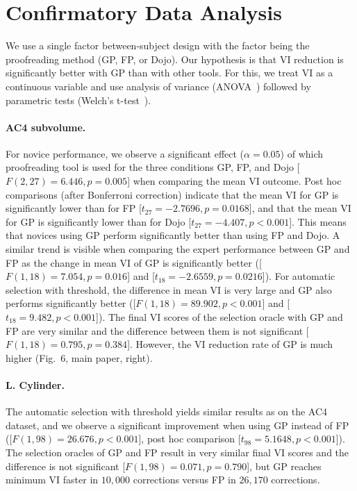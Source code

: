 \section{Confirmatory Data Analysis} 

We use a single factor between-subject design with the factor being the proofreading method (GP, FP, or Dojo). Our hypothesis is that VI reduction is significantly better with GP than with other tools. For this, we treat VI as a continuous variable and use analysis of variance (ANOVA~\cite{shaffer1995}) followed by parametric tests (Welch's t-test~\cite{welch}).

\paragraph{AC4 subvolume.} For novice performance, we observe a significant effect ($\alpha=0.05$) of which proofreading tool is used for the three conditions GP, FP, and Dojo [$F(2,27) = 6.446, p = 0.005$] when comparing the mean VI outcome. Post hoc comparisons (after Bonferroni correction) indicate that the mean VI for GP is significantly lower than for FP [$t_{27} = -2.7696, p = 0.0168$], and that the mean VI for GP is significantly lower than for Dojo [$t_{27} = -4.407, p < 0.001$]. This means that novices using GP perform significantly better than using FP and Dojo.
A similar trend is visible when comparing the expert performance between GP and FP as the change in mean VI of GP is significantly better ([$F(1,18) = 7.054, p = 0.016$] and [$t_{18} = -2.6559, p = 0.0216$]). For automatic selection with threshold, the difference in mean VI is very large and GP also performs significantly better ([$F(1,18) = 89.902, p < 0.001$] and [$t_{18} = 9.482, p < 0.001$]). The final VI scores of the selection oracle with GP and FP are very similar and the difference between them is not significant [$F(1,18) = 0.795, p = 0.384$]. However, the VI reduction rate of GP is much higher (Fig.~6, main paper, right).

\paragraph{L. Cylinder.} The automatic selection with threshold yields similar results as on the AC4 dataset, and we observe a significant improvement when using GP instead of FP ([$F(1,98) = 26.676, p < 0.001$], post hoc comparison [$t_{98} = 5.1648, p < 0.001$]). The selection oracles of GP and FP result in very similar final VI scores and the difference is not significant [$F(1,98) = 0.071, p = 0.790$], but GP reaches minimum VI faster in $10,000$ corrections versus FP in $26,170$ corrections.
    
    